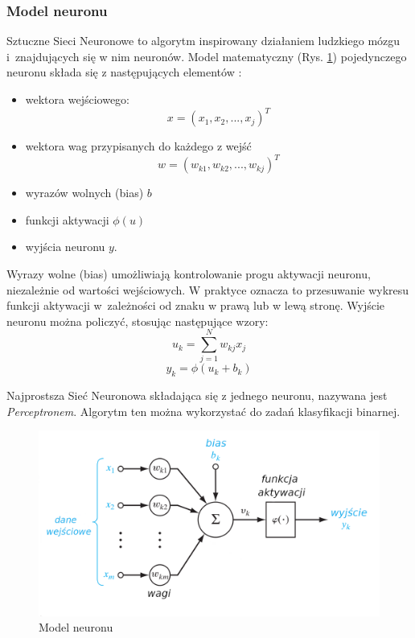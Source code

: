 \subsubsection{Model neuronu}
Sztuczne Sieci Neuronowe to algorytm inspirowany działaniem ludzkiego mózgu 
i~znajdujących się w nim neuronów. Model matematyczny (Rys. \ref{neuron}) pojedynczego neuronu składa się z następujących elementów \cite{Omondi2006FPGAIO}:
\begin{itemize}
  \item wektora wejściowego: 
  $$x = (x_1, x_2,...,x_j)^T$$
  \item wektora wag przypisanych do każdego z wejść
  $$w = (w_{k1}, w_{k2},...,w_{kj})^T$$
  \item wyrazów wolnych (bias) $b$
  \item funkcji aktywacji $\phi(u)$ 
  \item wyjścia neuronu $y$. 
\end{itemize}
Wyrazy wolne (bias) umożliwiają kontrolowanie progu aktywacji neuronu, niezależnie od wartości wejściowych. W praktyce oznacza to przesuwanie wykresu funkcji aktywacji w~zależności od znaku w prawą lub w lewą stronę. Wyjście neuronu można policzyć, stosując następujące wzory:
$$u_k = \sum_{j=1}^{N}{w_{kj}x_j} $$ 
$$y_k = \phi(u_k + b_k) $$ 

Najprostsza Sieć Neuronowa składająca się z jednego neuronu, nazywana jest \emph{Perceptronem}. Algorytm ten można wykorzystać do zadań klasyfikacji binarnej.

\begin{figure}[h]
  \centering
  \includegraphics[width=\textwidth]{img/neuron.png}
  \caption{Model neuronu \cite{haykin2009neural}}
  \label{neuron}
\end{figure}


